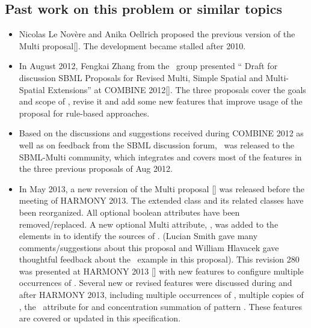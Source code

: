 \subsection{Past work on this problem or similar topics}
\label{def:Past_work}

\begin{itemize}
 \item 
  Nicolas Le Nov\`ere and Anika Oellrich proposed the previous version of the Multi proposal[\cite{ref:multi1}]. The development became stalled after 2010. 
 
 \item In August 2012, Fengkai Zhang from the \Simmune\ group presented `` Draft for discussion SBML Proposals for Revised Multi, Simple Spatial and Multi-Spatial Extensions'' at COMBINE 2012[\cite{ref:revisedMulti}]. The three proposals cover the goals and scope of \multiOneProposal, revise it and add some new features that improve usage of the proposal for rule-based approaches.
 
 \item Based on the discussions and suggestions received during COMBINE 2012 as well as on feedback from the SBML discussion forum, \multiTwoProposalVerTwo\ was released to the SBML-Multi community, which integrates and covers most of the features in the three previous proposals of Aug 2012. 
 
 \item In May 2013, a new reversion of the Multi proposal [\cite{ref:multiproposal280}] was released before the meeting of HARMONY 2013. The extended \ExCompartment class and its related classes have been reorganized. All optional boolean attributes have been removed/replaced. A new optional Multi attribute, , was added to the  elements in  to identify  the sources of \species. (Lucian Smith gave many comments/suggestions about this proposal and William Hlavacek gave thoughtful feedback about the \BioNetGen\ example in this proposal). This revision 280 was presented at HARMONY 2013  [\cite{ref:harmony2013}] with new features to configure multiple occurrences of \SpeciesFeatureType. Several new or revised features were discussed during and after HARMONY 2013, including multiple occurrences of \SpeciesFeatureType, multiple copies of \SpeciesTypeInstance, the \numericValueAtt\ attribute for \PossibleSpeciesFeatureValue and concentration summation of pattern \species. These features are covered or updated in this specification.
 

\end{itemize}
